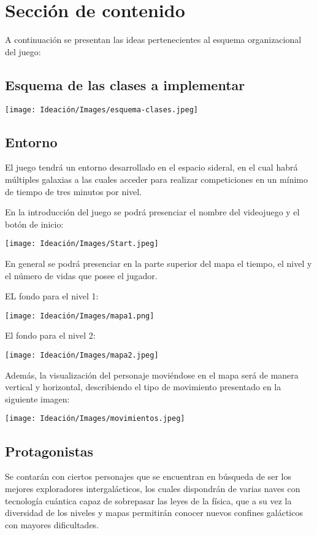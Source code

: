 \documentclass{article}
\begin{document}
\section{Sección de contenido} \label{contenido}
A continuación se presentan las ideas pertenecientes al esquema organizacional del juego:

\subsection{Esquema de las clases a implementar }

\texttt{[image: Ideación/Images/esquema-clases.jpeg]}


\subsection{Entorno}
El juego tendrá un entorno desarrollado en el espacio sideral, en el cual habrá múltiples galaxias a las cuales acceder para realizar competiciones en un mínimo de tiempo de tres minutos por nivel. 

En la introducción del juego se podrá presenciar el nombre del videojuego y el botón de inicio:


\texttt{[image: Ideación/Images/Start.jpeg]}


En general se podrá presenciar en la parte superior del mapa el tiempo, el nivel y el número de vidas que posee el jugador. 

EL fondo para el nivel 1: 

\texttt{[image: Ideación/Images/mapa1.png]}

El fondo para el nivel 2:

\texttt{[image: Ideación/Images/mapa2.jpeg]}

Además, la visualización del personaje moviéndose en el mapa será de manera vertical y horizontal, describiendo el tipo de movimiento presentado en la siguiente imagen:  

\texttt{[image: Ideación/Images/movimientos.jpeg]}


\subsection{Protagonistas}
Se contarán con ciertos personajes que se encuentran en búsqueda de ser los mejores exploradores intergalácticos, los cuales dispondrán de varias naves con tecnología cuántica capaz de sobrepasar las leyes de la física, que a su vez la diversidad de los niveles y mapas permitirán conocer nuevos confines galácticos con mayores dificultades. 
\end{document}

